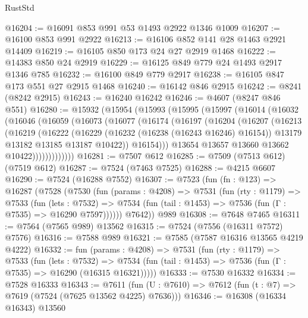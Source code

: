 \begin{lexlean}{RustStd}
\begin{coremodule}
@16204 := @16091 @853 @991 @53 @1493 @2922 @1346 @1009
@16207 := @16100 @853 @991 @2922
@16213 := @16106 @852 @141 @28 @1463 @2921 @14409
@16219 := @16105 @850 @173 @24 @27 @2919 @1468
@16222 := @14383 @850 @24 @2919
@16229 := @16125 @849 @779 @24 @1493 @2917 @1346 @785
@16232 := @16100 @849 @779 @2917
@16238 := @16105 @847 @173 @551 @27 @2915 @1468
@16240 := @16142 @846 @2915
@16242 := @8241 (@8242 @2915)
@16243 := @16240 @16242
@16246 := @4607 (@8247 @846 @551)
@16280 := @15932
    (@15954
      (@15993
        (@15995
          (@15997
            (@16014
              (@16032
                (@16046
                  (@16059
                    (@16073
                      (@16077
                        (@16174
                          (@16197
                            (@16204
                              (@16207
                                (@16213
                                  (@16219
                                    (@16222
                                      (@16229
                                        (@16232 (@16238 (@16243 @16246) @16154))
                                        @13179
                                        @13182
                                        @13185
                                        @13187
                                        @10422))
                                    @16154)))
                              @13654
                              @13657
                              @13660
                              @13662
                              @10422)))))))))))))
@16281 := @7507 @612
@16285 := @7509 (@7513 @612) (@7519 @612)
@16287 := @7524 (@7463 @7525)
@16288 := @4215 @6607
@16290 := @7524 (@16288 @7552)
@16307 := @7523
    (fun (fn : @123) =>
    @16287
      (@7528
        (@7530
          (fun (params : @4208) =>
          @7531
            (fun (rty : @1179) =>
            @7533
              (fun (lets : @7532) =>
              @7534 (fun (tail : @1453) => @7536 (fun (Γ : @7535) => @16290 @7597))))))
        @7642))
    @989
@16308 := @7648 @7465
@16311 := @7564 (@7565 @989) @13562
@16315 := @7524 (@7556 (@16311 @7572) @7576)
@16316 := @7588 @989
@16321 := @7585 (@7587 @16316 @13565 @4219 @4222)
@16332 := fun (params : @4208) =>
  @7531
    (fun (rty : @1179) =>
    @7533
      (fun (lets : @7532) =>
      @7534 (fun (tail : @1453) => @7536 (fun (Γ : @7535) => @16290 (@16315 @16321)))))
@16333 := @7530 @16332
@16334 := @7528 @16333
@16343 := @7611
    (fun (U : @7610) => @7612 (fun (t : @7) => @7619 (@7524 (@7625 @13562 @4225) @7636)))
@16346 := @16308 (@16334 @16343) @13560

\end{coremodule}
\end{lexlean}

